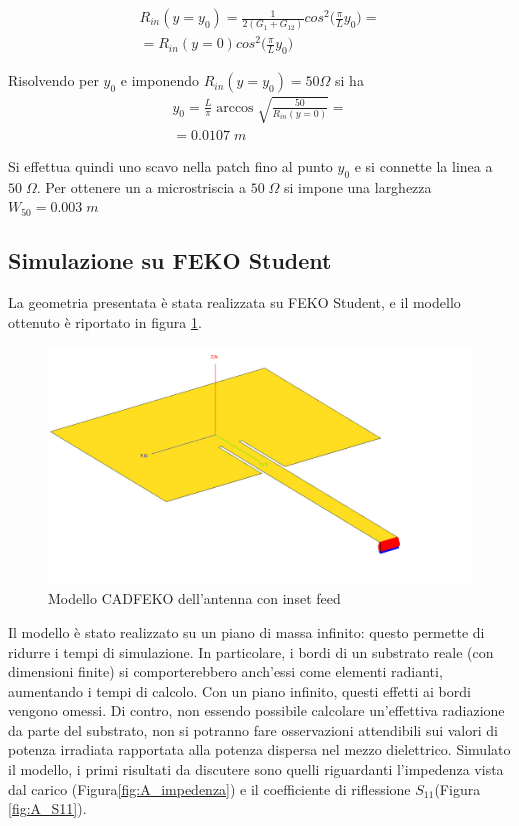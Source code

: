 \documentclass[twoside,twocolumn]{article}
\begin{document}
\begin{align*}
R_{in}(y=y_{0})=\frac{1}{2(G_{1}+G_{12})}cos^2\Big( \frac{\pi}{L}y_{0}\Big)=\\
=R_{in}(y=0)cos^2\Big(\frac{\pi}{L}y_{0}\Big)
\end{align*}

Risolvendo per $y_{0}$ e imponendo $R_{in}(y=y_{0})= 50 \Omega$ si ha 
\begin{align*}
 y_{0}= \frac {L}{\pi}\arccos\sqrt{\frac{50}{R_{in}(y=0)}}= \\=0.0107 \; m
\end{align*}

Si effettua quindi uno scavo nella patch fino al punto $y_{0}$ e si connette la linea a $50\; \Omega$.\newline
Per ottenere un a microstriscia a $50\; \Omega$ si impone una larghezza $W_{50}= 0.003 \; m$



\subsection*{Simulazione su FEKO Student}
La geometria presentata è stata realizzata su FEKO Student, e il modello ottenuto è riportato in figura \ref{fig:A_Cad}.

\begin{figure}[h!]
  \includegraphics[width=\linewidth]{A_Cad.jpg}
  \caption{Modello CADFEKO dell'antenna con inset feed}
  \label{fig:A_Cad}
\end{figure}
Il modello è stato realizzato su un piano di massa infinito: questo permette di ridurre i tempi di simulazione. In particolare, i bordi di un substrato reale (con dimensioni finite) si comporterebbero anch'essi come elementi radianti, aumentando i tempi  di calcolo.
Con un piano infinito, questi effetti ai bordi vengono omessi. Di contro, non essendo possibile calcolare un'effettiva radiazione da parte del substrato, non si potranno fare osservazioni attendibili sui valori di potenza irradiata rapportata alla potenza dispersa nel mezzo dielettrico.\newline \newline
Simulato il modello, i primi risultati da discutere sono quelli riguardanti l'impedenza vista dal carico (Figura\ref{fig:A_impedenza}) e il coefficiente di riflessione $S_{11}$(Figura  \ref{fig:A_S11}).
\end{document}
